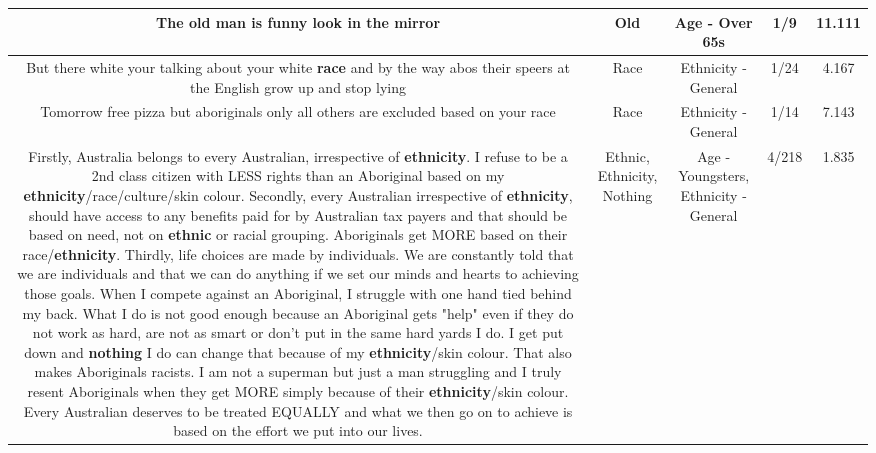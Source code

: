 \documentclass[11pt]{article}
\newlength\mylength
\begin{document}
\begin{center}
\begin{longtable}{|C{.65\mylength}|C{.30\mylength}|C{.12\mylength}|C{.12\mylength}|C{.12\mylength}|}
  \small The \textbf{old} man is funny look in the mirror\normalsize   & Old & Age - Over 65s & 1/9 & 11.111 \\  \hline
  \small But there white your talking about your white \textbf{race} and by the way abos their speers at the English grow up and stop lying\normalsize   & Race & Ethnicity - General & 1/24 & 4.167 \\  \hline
  \small Tomorrow free pizza but aboriginals only all others are excluded based on your race\normalsize   & Race & Ethnicity - General & 1/14 & 7.143 \\  \hline
  \small Firstly, Australia belongs to every Australian, irrespective of \textbf{ethnicity}.  I refuse to be a 2nd class citizen with LESS rights than an Aboriginal based on my \textbf{ethnicity}/race/culture/skin colour.  Secondly, every Australian irrespective of \textbf{ethnicity}, should have access to any benefits paid for by Australian tax payers and that should be based on need, not on \textbf{ethnic} or racial grouping.  Aboriginals get MORE based on their race/\textbf{ethnicity}.   Thirdly, life choices are made by individuals.  We are constantly told that we are individuals and that we can do anything if we set our minds and hearts to achieving those goals.  When I compete against an Aboriginal, I struggle with one hand tied behind my back.  What I do is not good enough because an Aboriginal gets "help" even if they do not work as hard, are not as smart or don't put in the same hard yards I do.  I get put down and \textbf{nothing} I do can change that because of my \textbf{ethnicity}/skin colour.  That also makes Aboriginals racists.  I am not a superman but just a man struggling and I truly resent Aboriginals when they get MORE simply because of their \textbf{ethnicity}/skin colour.  Every Australian deserves to be treated EQUALLY and what we then go on to achieve is based on the effort we put into our lives.\normalsize   & Ethnic, Ethnicity, Nothing & Age - Youngsters, Ethnicity - General & 4/218 & 1.835 \\  \hline

\end{longtable}
\end{center}
\end{document}
